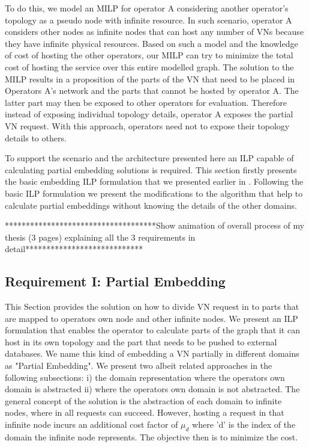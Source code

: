 \documentclass[article,dr=phil,type=msc ,colorback,accentcolor=tud4b]{tudthesis}
\begin{document}
To do this, we model an MILP for operator A considering
another operator's topology as a pseudo node with infinite
resource. In such scenario,
operator A considers other nodes as infinite nodes that can
host any number of VNs because they have infinite physical
resources. Based on such a model and the knowledge of cost
of hosting the other operators, our MILP can try to minimize
the total cost of hosting the service over this entire modelled
graph. The solution to the MILP results in a proposition of
the parts of the VN that need to be placed in Operators A’s
network and the parts that cannot be hosted by operator A.
The latter part may then be exposed to other operators for
evaluation. Therefore instead of exposing individual topology
details, operator A exposes the partial VN request. With this
approach, operators need not to expose their topology details to others.  

To support the scenario and the architecture presented here an ILP capable of calculating partial embedding
solutions is required. This section firstly presents the
basic embedding ILP formulation that we presented earlier
in \cite{vneapproach}. Following the basic ILP formulation we present the
modifications to the algorithm that help to calculate partial
embeddings without knowing the details of the other domains.


************************************Show animation of overall process of my thesis (3 pages) explaining all the 3 requirements in detail****************************

\subsection{Requirement I: Partial Embedding}

This Section provides the solution on how to divide VN
request in to parts that are mapped to operators own node
and other infinite nodes. We present an ILP formulation
that enables the operator to calculate parts of the graph
that it can host in its own topology and the part that needs
to be pushed to external databases. We name this kind of embedding a VN partially in different domains as "Partial Embedding". We present two albeit
related approaches in the following subsections: i) the domain
representation where the operators own domain is abstracted
ii) where the operators own domain is not abstracted. The
general concept of the solution is the abstraction of each
domain to infinite nodes, where in all requests can succeed.
However, hosting a request in that infinite node incurs an
additional cost factor of $\mu_{d}$ where 'd' is the index of the
domain the infinite node represents. The objective then is to
minimize the cost. \newline
\end{document}
